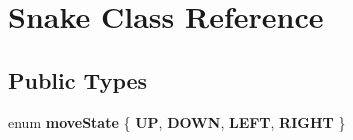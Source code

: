 \hypertarget{class_snake}{}\section{Snake Class Reference}
\label{class_snake}
\subsection*{Public Types}
\begin{DoxyCompactItemize}
\item 
\mbox{\label{class_snake_af0cc1dc5acd878a6530198ba11d701f4}} 
enum {\bfseries move\+State} \{ {\bfseries UP}, 
{\bfseries D\+O\+WN}, 
{\bfseries L\+E\+FT}, 
{\bfseries R\+I\+G\+HT}
 \}
\end{DoxyCompactItemize}

